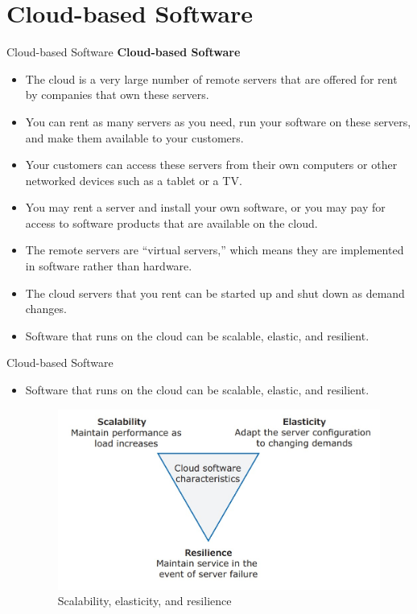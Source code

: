 \documentclass{beamer}
\begin{document}
\section{Cloud-based Software }
\begin{frame}{Cloud-based Software}
\textbf{Cloud-based Software}
\begin{itemize}
	\item The cloud is a very large number of remote servers that are offered for rent by companies that own these servers.
	\item You can rent as many servers as you need, run your software on these servers, and make them available to your customers.
	\item Your customers can access these servers from their own computers or other networked devices such as a tablet or a TV. 
	\item You may rent a server and install your own software, or you may pay for access to software products that are available on the cloud.
	\item The remote servers are “virtual servers,” which means they are implemented in software rather than hardware.
	\item The cloud servers that you rent can be started up and shut down as demand changes.
	\item Software that runs on the cloud can be scalable, elastic, and resilient.
\end{itemize}
\end{frame}
\begin{frame}{Cloud-based Software}
	\begin{itemize}
		\item Software that runs on the cloud can be scalable, elastic, and resilient.
			\begin{figure}
			\includegraphics[scale=.4]{img/m5_4}
			\caption{Scalability, elasticity, and resilience}
		\end{figure}
	\end{itemize}
\end{frame}
\end{document}
